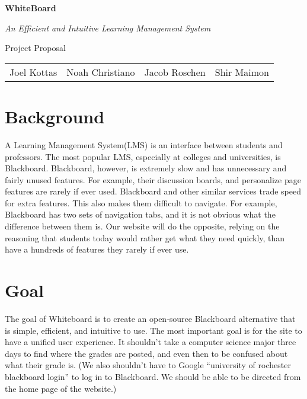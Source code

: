 \documentclass{article}
\begin{document}
\begin{center}
    \huge{\textbf{WhiteBoard}}
    
    \huge{\textit{An Efficient and Intuitive Learning Management System}}

    \huge{Project Proposal}

    \vspace{10 pt}

    \large{
        \begin{tabular}{cccc}
            Joel Kottas&Noah Christiano&Jacob Roschen&Shir Maimon\\
        \end{tabular}
    }

\end{center}

\vspace{10 pt}

\section{Background}

A Learning Management System(LMS) is an interface between students and
professors. The most popular LMS, especially at colleges and universities, is
Blackboard. Blackboard, however, is extremely slow and has unnecessary and
fairly unused features. For example, their discussion boards, and personalize
page features are rarely if ever used. Blackboard and other similar services
trade speed for extra features. This also makes them difficult to navigate.
For example, Blackboard has two sets of navigation tabs, and it is not obvious
what the difference between them is. Our website will do the opposite, relying
on the reasoning that students today would rather get what they need quickly,
than have a hundreds of features they rarely if ever use.

\section{Goal}

The goal of Whiteboard is to create an open-source Blackboard alternative that
is simple, efficient, and intuitive to use. The most important goal is for the
site to have a unified user experience. It shouldn't take a computer science
major three days to find where the grades are posted, and even then to be
confused about what their grade is. (We also shouldn't have to Google
``university of rochester blackboard login'' to log in to Blackboard. We should
be able to be directed from the home page of the website.)
\end{document}
